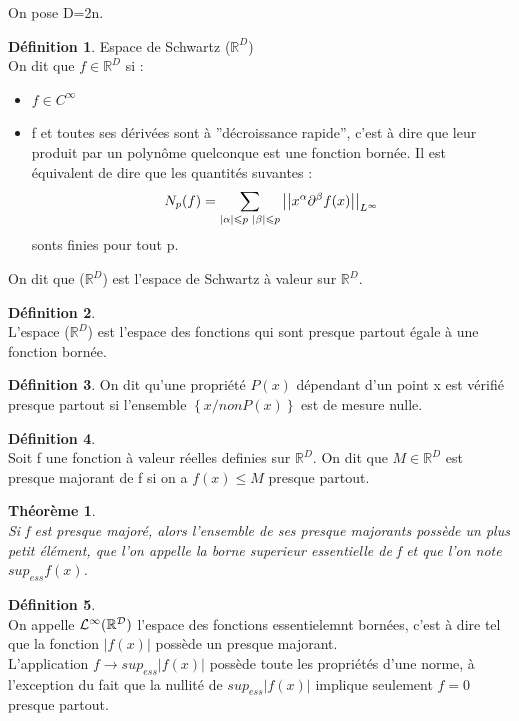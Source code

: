\documentclass[a4paper,11pt]{article}
\theoremstyle{plain}
\newtheorem{thm}{Théorème}[section]
\theoremstyle{definition}
\newtheorem{dfn}{Définition}[section]
\theoremstyle{remark}
\numberwithin{equation}{section}
\numberwithin{equation}{subsection}
\numberwithin{figure}{section}
\begin{document}
\noindent
On pose D=2n.
\begin{dfn} 
 Espace de Schwartz ($\mathbb{R}^{D}$)\\
On dit que $f \in \mathbb{R}^{D}$ si :
\begin{itemize}
 \item $f \in C^{\infty}$
 \item f et toutes ses dérivées sont à ''décroissance rapide'', c'est à dire que leur produit par un polynôme quelconque est une 
fonction bornée. Il est équivalent de dire que les quantités suvantes :
\begin{eqnarray}
 N_{p} (f) = \sum_{ |\alpha| \leqslant p \hspace{1mm}   |\beta| \leqslant p }  
\left |  \left | x^{\alpha} \partial^{\beta} f(x)  \right |   \right |_{L^{\infty}}
\end{eqnarray}
 sonts finies pour tout p.
\end{itemize}
On dit que ($\mathbb{R}^{D}$) est l'espace de Schwartz à valeur sur $\mathbb{R}^{D}$.
\end{dfn}
\begin{dfn} $\left. \right. $\\
 L'espace ($\mathbb{R}^{D}$) est l'espace des fonctions qui sont presque partout égale à une fonction bornée.
\end{dfn}
\begin{dfn} 
 On dit qu'une propriété $P(x)$ dépendant d'un point x est vérifié presque partout si l'ensemble $\left \{ x / non P(x) \right \}$ est 
de mesure nulle.
\end{dfn}
\begin{dfn} $\left. \right. $\\
  Soit f une fonction à valeur réelles definies sur $\mathbb{R}^{D}$. On dit que $M \in \mathbb{R}^{D}$ est presque majorant 
de f si on a $f(x)  \leqslant M$ presque partout.
\end{dfn}
\begin{thm}  $\left. \right. $\\
Si f est presque majoré, alors l'ensemble de ses presque majorants possède un plus petit élément, que l'on appelle la borne 
superieur essentielle de f et que l'on note $sup_{ess} f(x)$.
\end{thm}
\begin{dfn} $\left. \right. $\\
 On appelle $\cal{L}^{\infty}(\mathbb{R}^{D})$ l'espace des fonctions essentielemnt bornées, c'est à dire tel que la fonction $|f(x)|$ 
possède un presque majorant.\\
L'application $f \to sup_{ess} |f(x)| $ possède toute les propriétés d'une norme, à l'exception du fait que la nullité de $sup_{ess} |f(x)| $ 
implique seulement $f=0$ presque partout.
\end{dfn}
\end{document}
